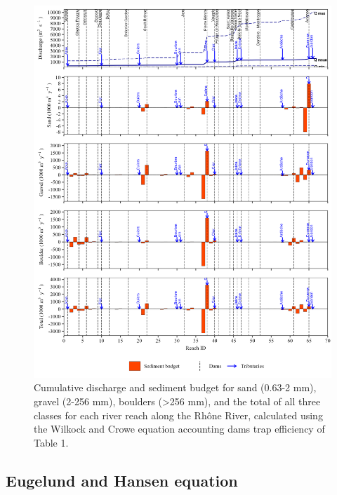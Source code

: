 \documentclass[
]{book}
\begin{document}
\begin{figure}
\includegraphics[width=26.24in]{img/res_cascade/res_E2_eW&C/plots_sed_budget-silt/sed_bud_res_sum_hy_E2_eW&C} \caption{Cumulative discharge and sediment budget for sand (0.63-2 mm), gravel (2-256 mm), boulders (>256 mm), and the total of all three classes for each river reach along the Rhône River, calculated using the Wilkock and Crowe equation accounting dams trap efficiency of Table 1.}\label{fig:budgetE2eW}
\end{figure}

\subsection{Eugelund and Hansen equation}\label{eugelund-and-hansen-equation-2}
\end{document}
